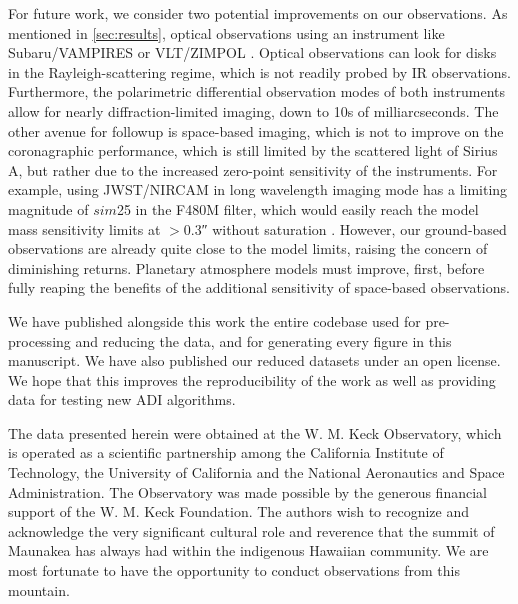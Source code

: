 \documentclass[twocolumn]{aastex631}
\begin{document}
For future work, we consider two potential improvements on our observations. As mentioned in \autoref{sec:results}, optical observations using an instrument like Subaru/VAMPIRES \citep{norris_vampires_2014} or VLT/ZIMPOL \citep{schmid_zimpol_2018}. Optical observations can look for disks in the Rayleigh-scattering regime, which is not readily probed by IR observations. Furthermore, the polarimetric differential observation modes of both instruments allow for nearly diffraction-limited imaging, down to 10s of milliarcseconds. The other avenue for followup is space-based imaging, which is not to improve on the coronagraphic performance, which is still limited by the scattered light of Sirius A, but rather due to the increased zero-point sensitivity of the instruments. For example, using JWST/NIRCAM in long wavelength imaging mode has a limiting magnitude of $sim$25 in the F480M filter, which would easily reach the model mass sensitivity limits at $>$\ang{;;0.3} without saturation \citep{pontoppidan_pandeia_2016}. However, our ground-based observations are already quite close to the model limits, raising the concern of diminishing returns. Planetary atmosphere models must improve, first, before fully reaping the benefits of the additional sensitivity of space-based observations.

We have published alongside this work the entire codebase used for pre-processing and reducing the data, and for generating every figure in this manuscript. We have also published our reduced datasets under an open license. We hope that this improves the reproducibility of the work as well as providing data for testing new ADI algorithms.

\begin{acknowledgements}
The data presented herein were obtained at the W. M. Keck Observatory, which is operated as a scientific partnership among the California Institute of Technology, the University of California and the National Aeronautics and Space Administration. The Observatory was made possible by the generous financial support of the W. M. Keck Foundation. The authors wish to recognize and acknowledge the very significant cultural role and reverence that the summit of Maunakea has always had within the indigenous Hawaiian community. We are most fortunate to have the opportunity to conduct observations from this mountain.
\end{acknowledgements}



\end{document}
